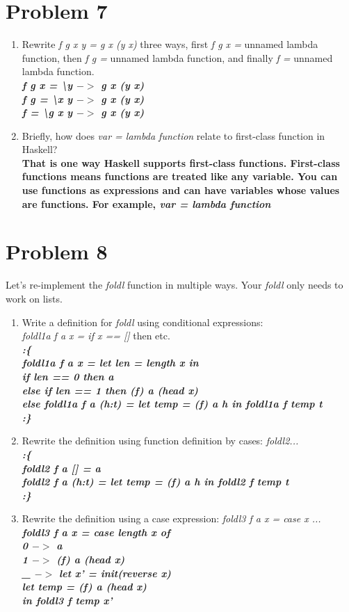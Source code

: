 \documentclass[a4paper, 12pt,fleqn]{article}
\begin{document}
\section*{Problem 7}
\begin{enumerate}[label = (\alph*)]
\item Rewrite \textit{f g x y = g x (y x)} three ways, first \textit{f g x =} unnamed lambda function, then \textit{f g =} unnamed lambda function, and finally \textit{f =} unnamed lambda function.\\
\textbf{
\textit{f g x = \textbackslash y $->$ g x (y x)\\
f g = \textbackslash x y $->$ g x (y x)\\
f = \textbackslash g x y $->$ g x (y x)
}
}
\item Briefly, how does \textit{var = lambda function} relate to first-class function in Haskell?\\
\textbf{
That is one way Haskell supports first-class functions. First-class functions means functions are treated like any variable. You can use functions as expressions and can have variables whose values are functions. For example, \textit{var = lambda function}
}
\end{enumerate}
\section*{Problem 8}
Let's re-implement the \textit{foldl} function in multiple ways. Your \textit{foldl} only needs to work on lists.
\begin{enumerate}[label = (\alph*)]
\item Write a definition for \textit{foldl} using conditional expressions:\\ \textit{foldl1a f a x = if x == []} then etc.\\
\textbf{
\textit{
:\{\\
foldl1a f a x = let len = length x in\\
if len == 0 then a\\
else if len == 1 then (f) a (head x)\\
else foldl1a f a (h:t) = let temp = (f) a h in foldl1a f temp t\\
:\}
}
}
\pagebreak
\item Rewrite the definition using function definition by cases: \textit{foldl2...}\\
\textbf{
\textit{
:\{\\
foldl2 f a [] = a\\
foldl2 f a (h:t) = let temp = (f) a h in foldl2 f temp t\\
:\}
}
}
\item Rewrite the definition using a case expression: \textit{foldl3 f a x = case x ...}\\
\textbf{
\textit{
foldl3 f a x = case length x of\\
0 $->$ a\\
1 $->$ (f) a (head x)\\
\_ $->$ let x' = init(reverse x)\\
let temp = (f) a (head x)\\
in foldl3 f temp x'
}
}
\end{enumerate}
\end{document}
